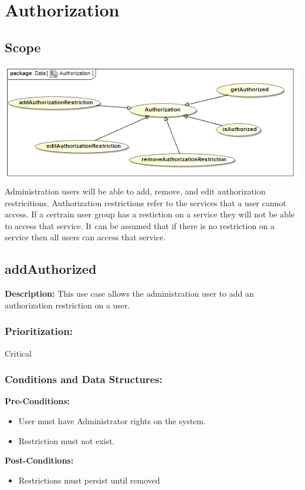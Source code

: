 
\section{Authorization}


\subsection{Scope}
\includegraphics[width=1\linewidth]{./Graphics/Authorization}
Administration  users will be able to add, remove, and edit authorization restricitions. Authorization restrictions refer to the services that a user cannot access. If a certrain user group has a restiction on a service they will not be able to access that service. It can be assumed that if there is no restriction on a service then all users can access that service.


\subsection{addAuthorized}
\textbf{Description:}
This use case allows the administration user to add an authorization restriction on a user.
\subsubsection{Prioritization:}
Critical
\subsubsection{Conditions and Data Structures:}
\textbf{Pre-Conditions:}
\begin{itemize}
	\item User must have Administrator rights on  the system.
	\item Restriction must not exist.
\end{itemize}
\textbf{Post-Conditions:}
\begin{itemize}
	\item Restrictions must persist until removed
\end{itemize}
